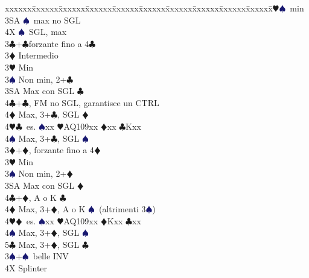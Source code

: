 \documentclass[a4paper,italian]{article}
\newcommand{\BC}{\textcolor{OliveGreen}{$\clubsuit$}}
\newcommand{\BD}{\textcolor{RedOrange}{$\vardiamondsuit$}}
\newcommand{\BH}{\textcolor{Red2}{$\varheartsuit${}}}
\newcommand{\BS}{\textcolor{MidnightBlue}{$\spadesuit${}}}
\newenvironment{bidtable}
{\begin{tabbing}

    xxxxxx\=xxxxxx\=xxxxxx\=xxxxxx\=xxxxxx\=xxxxxx\=xxxxxx\=xxxxxx\=xxxxxx\=xxxxxx\=\kill}
{\end{tabbing} }%
\begin{document}
\begin{multicols*}{2}
\begin{bidtable}
                                            3\BH {}\BS\ min\\
                                            3SA \BS\ max no SGL\\
                                            4X \BS\ SGL, max\-\\
                                            3\BC {}+\BC forzante fino a 4\BC\+\\
                                            3\BD \> Intermedio\\
                                            3\BH\> Min\\
                                            3\BS\> Non min, 2+\BC\\
                                            3SA\> Max con SGL \BC\\
                                            4\BC{}+\BC, FM no SGL, garantisce un CTRL\\
                                            4\BD\> Max, 3+\BC, SGL \BD\\
                                            4\BH{}\BC\ es. \BS xx \BH AQ109xx \BD xx \BC Kxx\\
                                            4\BS\> Max, 3+\BC, SGL \BS\-\\
                                            3\BD {}+\BD, forzante fino a 4\BD\+\\
                                            3\BH\> Min\\
                                            3\BS\> Non min, 2+\BD\\
                                            3SA\> Max con SGL \BD\\
                                            4\BC{}+\BD, A o K \BC\\
                                            4\BD\> Max, 3+\BD, A o K \BS\ (altrimenti 3\BS)\\
                                            4\BH{}\BD\ es. \BS xx \BH AQ109xx \BD Kxx \BC xx\\
                                            4\BS\> Max, 3+\BD, SGL \BS\\
                                            5\BC\> Max, 3+\BD, SGL \BC\-\\
                                            3\BS {}+\BS\ belle INV\\
                                            4X \> Splinter\-\\
                                        \end{bidtable}
                                        \vfill
                                        \parbox{\textwidth}{}
                                        \columnbreak


\end{multicols*}
\end{document}
